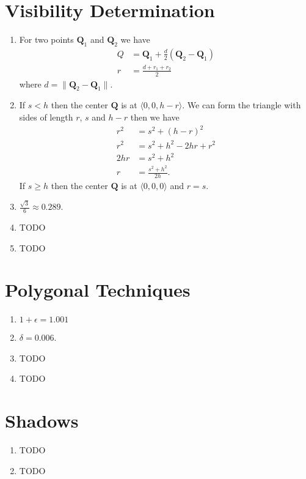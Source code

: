 \documentclass[a4paper]{report}
\begin{document}
\chapter{Visibility Determination}
\begin{enumerate}
	\item For two points $\mathbf{Q}_1$ and $\mathbf{Q}_2$ we have
		\begin{align*}
			Q &= \mathbf{Q}_1 + \frac{d}{2}(\mathbf{Q}_2 - \mathbf{Q}_1)\\
			r &= \frac{d + r_1 + r_2}{2}
		\end{align*}
		where $d = \lVert \mathbf{Q}_2 - \mathbf{Q}_1 \rVert$.
	\item If $s < h$ then the center $\mathbf{Q}$ is at $\langle 0, 0, h - r \rangle$. We can form the triangle
		with sides of length $r$, $s$ and $h - r$ then we have
		\begin{align*}
			r^2 &= s^2 + {(h - r)}^2\\
			r^2 &= s^2 + h^2 - 2hr + r^2\\
			2hr &= s^2 + h^2\\
			r &= \frac{s^2 + h^2}{2h}.
		\end{align*}
		If $s \geq h$ then the center $\mathbf{Q}$ is at $\langle 0, 0, 0 \rangle$ and $r = s$.
	\item $\frac{\sqrt{3}}{6} \approx 0.289$.
	\item TODO
	\item TODO
\end{enumerate}

\chapter{Polygonal Techniques}
\begin{enumerate}
	\item $1 + \epsilon = 1.001$
	\item $\delta = 0.006$.
	\item TODO
	\item TODO
\end{enumerate}


\chapter{Shadows}
\begin{enumerate}
	\item TODO
	\item TODO
\end{enumerate}
\end{document}
